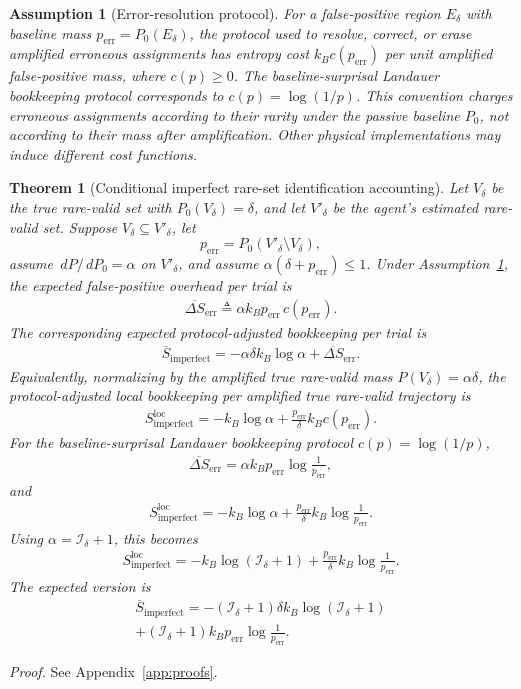 \documentclass[
  aps,
  prresearch,
  reprint,
  amsmath,
  amssymb,
  superscriptaddress,
  nofootinbib,
  longbibliography
]{revtex4-2}
\def\EQSP{3pt}
\newcommand{\mltlne}[2][\EQSP]{\begingroup\setlength\abovedisplayskip{#1}\setlength\belowdisplayskip{#1}\begin{equation}\begin{multlined} #2 \end{multlined}\end{equation}\endgroup\noindent}
\newcommand{\cgather}[2][\EQSP]{\begingroup\setlength\abovedisplayskip{#1}\setlength\belowdisplayskip{#1}\begin{gather} #2 \end{gather}\endgroup\noindent}
\newcommand{\cgathers}[2][\EQSP]{\begingroup\setlength\abovedisplayskip{#1}\setlength\belowdisplayskip{#1}\begin{gather*} #2 \end{gather*}\endgroup\noindent}
\newtheorem{theorem}{Theorem}
\newtheorem{assumption}{Assumption}
\newcommand{\calI}{\mathcal{I}}
\newcommand{\dd}{\,d}
\begin{document}
\begin{assumption}[Error-resolution protocol]
\label{ass:error_resolution_protocol}
For a false-positive region \(E_\delta\) with baseline mass
\(p_{\mathrm{err}}=P_0(E_\delta)\), the protocol used to resolve,
correct, or erase amplified erroneous assignments has entropy cost
\(k_B c(p_{\mathrm{err}})\) per unit amplified false-positive mass, where \(c(p)\geq 0\). The baseline-surprisal Landauer bookkeeping protocol corresponds to
\(c(p)=\log(1/p)\). This convention charges erroneous assignments
according to their rarity under the passive baseline \(P_0\), not
according to their mass after amplification. Other physical
implementations may induce different cost functions.
\end{assumption}

\begin{theorem}[Conditional imperfect rare-set identification accounting]
\label{thm:conditional_imperfect_penalty}
Let \(V_\delta\) be the true rare-valid set with \(P_0(V_\delta)=\delta\), and let \(V'_\delta\) be the agent's estimated rare-valid set. Suppose \(V_\delta\subseteq V'_\delta\), let
\[
    p_{\mathrm{err}}=P_0(V'_\delta\setminus V_\delta),
\]
assume \(\dd P/\dd P_0=\alpha\) on \(V'_\delta\), and assume \(\alpha(\delta+p_{\mathrm{err}})\leq1\). Under Assumption~\ref{ass:error_resolution_protocol}, the expected false-positive overhead per trial is
\cgather{
    \overline{\Delta S}_{\mathrm{err}}
    \triangleq 
    \alpha k_B p_{\mathrm{err}}\,c(p_{\mathrm{err}}).
    \label{eq:DeltaSerr_general}
}
The corresponding expected protocol-adjusted bookkeeping per trial is
\cgather{
    \overline S_{\mathrm{imperfect}}
    =
    -\alpha\delta k_B\log\alpha
    +
    \overline{\Delta S}_{\mathrm{err}}.
    \label{eq:imperfect_expected_general}
}
Equivalently, normalizing by the amplified true rare-valid mass \(P(V_\delta)=\alpha\delta\), the protocol-adjusted local bookkeeping per amplified true rare-valid trajectory is
\cgather{
    S_{\mathrm{imperfect}}^{\mathrm{loc}}
    =
    -k_B\log\alpha
    +
    \frac{p_{\mathrm{err}}}{\delta}k_B c(p_{\mathrm{err}}).
    \label{eq:imperfect_local_general}
}
For the baseline-surprisal Landauer bookkeeping protocol \(c(p)=\log(1/p)\),
\cgather{
    \overline{\Delta S}_{\mathrm{err}}
    =
    \alpha k_B p_{\mathrm{err}}
    \log\frac{1}{p_{\mathrm{err}}},
    \label{eq:DeltaSerr_baseline_landauer}
}
and
\cgather{
    S_{\mathrm{imperfect}}^{\mathrm{loc}}
    =
    -k_B\log\alpha
    +
    \frac{p_{\mathrm{err}}}{\delta}k_B
    \log\frac{1}{p_{\mathrm{err}}}.
    \label{eq:imperfect_alpha}
}
Using \(\alpha=\calI_\delta+1\), this becomes
\cgathers{
    S_{\mathrm{imperfect}}^{\mathrm{loc}}
    =
    -k_B\log(\calI_\delta+1)
    +
    \frac{p_{\mathrm{err}}}{\delta} k_B
    \log\frac{1}{p_{\mathrm{err}}}.
}
The expected version is
\mltlne{
    \overline S_{\mathrm{imperfect}}
    =
    -(\calI_\delta+1)\delta k_B\log(\calI_\delta+1)
    \\+
    (\calI_\delta+1)k_Bp_{\mathrm{err}}
    \log\frac{1}{p_{\mathrm{err}}}.
}
\end{theorem}
\noindent\emph{Proof.} See Appendix~\ref{app:proofs}.
\end{document}
